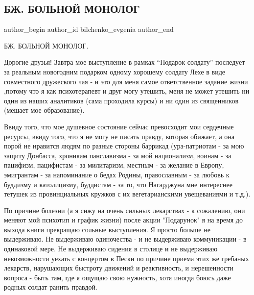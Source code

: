  
 
 
 
 
 
\subsection{БЖ. БОЛЬНОЙ МОНОЛОГ}
\label{sec:29_12_2014.fb.bilchenko_evgenia.1.bolnoj_monolog}
\ifcmt
 author_begin
   author_id bilchenko_evgenia
 author_end
\fi

БЖ. БОЛЬНОЙ МОНОЛОГ.

Дорогие друзья! Завтра мое выступление в рамках \enquote{Подарок солдату} последует за
реальным новогодним подарком одному хорошему солдату Лехе в виде совместного
дружеского чая - и это для меня самое ответственное задание жизни ,потому что я
как психотерапевт и друг могу утешить, меня не может утешить ни один из наших
аналитиков (сама проходила курсы) и ни один из священников (мешает мое
образование).  

Ввиду того, что мое душевное состояние сейчас превосходит мои
сердечные ресурсы, ввиду того, что я не могу не писать правду, которая обижает,
а она порой не нравится людям по разные стороны баррикад (ура-патриотам - за
мою защиту Донбасса, хроникам панславизма - за мой национализм, воинам - за
пацифизм, пацифистам - за милитаризм, местным - за желание в Европу, эмигрантам
- за напоминание о бедах Родины, православным  - за любовь к буддизму и
католицизму, буддистам - за то, что Нагарджуна мне интереснее тетушек из
провинциальных кружков с их вегетарианскими увещеваниями и т.д.).

По причине болезни (а я сижу на очень сильных лекарствах - к сожалению, они
меняют мой психотип и график жизни) после акции "Подарунок" я на время до
выхода книги прекращаю сольные выступления. Я просто  больше не выдерживаю. Не
выдерживаю одиночества - и не выдерживаю коммуникации - в одинаковой мере. Не
выдерживаю сидения в столице и не выдерживаю невозможности уехать с концертом в
Пески по причине приема этих же гребаных лекарств, нарушающих быстроту движений
и реактивность, и нерешенности вопроса - быть там, где я  ощущаю свою нужность,
хотя иногда боюсь даже родных солдат ранить правдой. 

